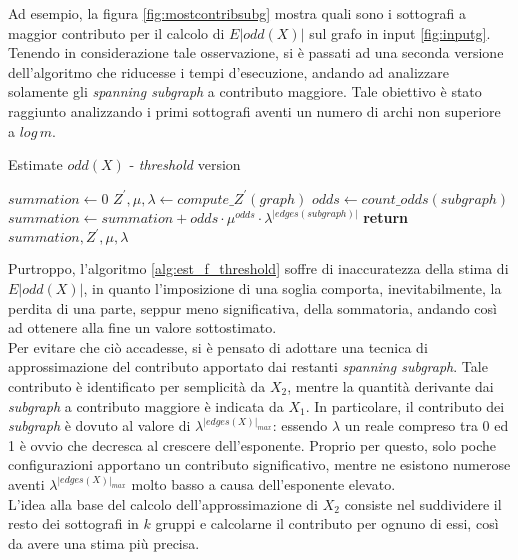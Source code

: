 Ad esempio, la figura \ref{fig:mostcontribsubg} mostra quali sono i sottografi a maggior contributo per il calcolo di $E|odd(X)|$ sul grafo in input \ref{fig:inputg}.
Tenendo in considerazione tale osservazione, si è passati ad una seconda versione dell'algoritmo che riducesse i tempi d'esecuzione, andando ad analizzare solamente gli \textit{spanning subgraph} a contributo maggiore. Tale obiettivo è stato raggiunto analizzando i primi sottografi aventi un numero di archi non superiore a $log\,m$.
\begin{algorithm}
	\caption{Estimate $odd(X)$ - \textit{threshold} version}
	\label{alg:est_f_threshold}
	\begin{algorithmic}[1] %
		\State $summation\gets 0$
		\State $Z^{\prime}, \mu, \lambda \gets compute\_Z^\prime(graph)$
		\State $odds \gets count\_odds(subgraph)$ 
		\State $summation \gets summation + odds \cdot \mu^{odds} \cdot \lambda^{|edges(subgraph)|}$
		\EndFor
		\State \textbf{return} $summation, Z^{\prime}, \mu, \lambda$
		\EndProcedure
	\end{algorithmic}
\end{algorithm}
Purtroppo, l'algoritmo \ref{alg:est_f_threshold} soffre di inaccuratezza della stima di $E|odd(X)|$, in quanto l'imposizione di una soglia comporta, inevitabilmente, la perdita di una parte, seppur meno significativa, della sommatoria, andando così ad ottenere alla fine un valore sottostimato.\\
Per evitare che ciò accadesse, si è pensato di adottare una tecnica di approssimazione del contributo apportato dai restanti \textit{spanning subgraph}. Tale contributo è identificato per semplicità da $X_2$, mentre la quantità derivante dai \textit{subgraph} a contributo maggiore è indicata da $X_1$. In particolare, il contributo dei \textit{subgraph} è dovuto al valore di $\lambda^{|edges(X)|_{max}}$: essendo $\lambda$ un reale compreso tra 0 ed 1 è ovvio che decresca al crescere dell'esponente. Proprio per questo, solo poche configurazioni apportano un contributo significativo, mentre ne esistono numerose aventi $\lambda^{|edges(X)|_{max}}$ molto basso a causa dell'esponente elevato.\\
L'idea alla base del calcolo dell'approssimazione di $X_2$ consiste nel suddividere il resto dei sottografi in $k$ gruppi e calcolarne il contributo per ognuno di essi, così da avere una stima più precisa.\\
